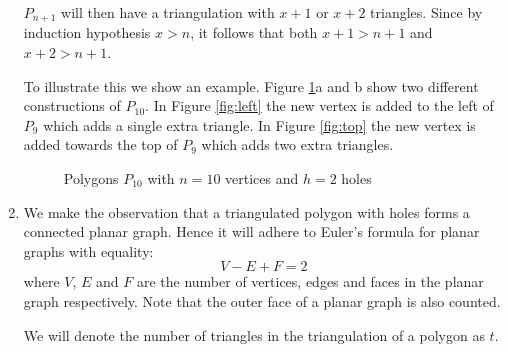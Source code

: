 \documentclass{article}
\begin{document}
\begin{enumerate}
    $P_{n+1}$ will then have a triangulation with $x + 1$ or $x + 2$ triangles.
    Since by induction hypothesis $x > n$, it follows that both $x+1 > n+1$ and $x+2 > n+1$.

    To illustrate this we show an example. Figure \ref{fig:p10}a and b show two different constructions of $P_{10}$. In Figure \ref{fig:left} the new vertex is added to the left of $P_9$ which adds a single extra triangle.
    In Figure \ref{fig:top} the new vertex is added towards the top of $P_9$ which adds two extra triangles.

    \begin{figure}[H]
      \centering
        \caption{Polygons $P_{10}$ with $n=10$ vertices and $h=2$ holes} 
        \label{fig:p10}
      \end{figure}

    \item We make the observation that a triangulated polygon with holes forms a connected planar graph. Hence it will adhere to Euler's formula for planar graphs with equality:
    \begin{equation*}
      V - E + F = 2
    \end{equation*}
    where $V$, $E$ and $F$ are the number of vertices, edges and faces in the planar graph respectively. 
    Note that the outer face of a planar graph is also counted. 

    We will denote the number of triangles in the triangulation of a polygon as $t$. \\


\end{enumerate}
\end{document}
